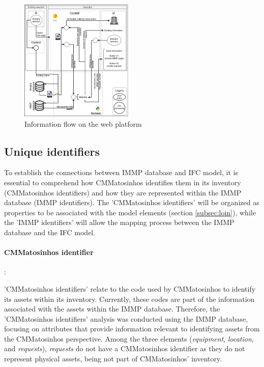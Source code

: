 \documentclass[a4paper, 10pt, twocolumn, twoside]{article}
\begin{document}
\begin{figure}[!htb]
    \centering
    \includegraphics[width=0.48\textwidth]{Images/fluxo.pdf}
    \caption{Information flow on the web platform}
    \label{fig_fluxo}
\end{figure}

\subsection{Unique identifiers}
\label{subsec:identifiers}

To establish the connections between IMMP database and IFC model, it is essential to comprehend how CMMatosinhos identifies them in its inventory (CMMatosinhos identifiers) and how they are represented within the IMMP database (IMMP identifiers). The 'CMMatosinhos identifiers' will be organized as properties to be associated with the model elements (section \ref{subsec:loin}), while the 'IMMP identifiers' will allow the mapping process between the IMMP database and the IFC model.

\paragraph{CMMatosinhos identifier}:

'CMMatosinhos identifiers' relate to the code used by CMMatosinhos to identify its assets within its inventory. Currently, these codes are part of the information associated with the assets within the IMMP database. Therefore, the 'CMMatosinhos identifiers' analysis was conducted using the IMMP database, focusing on attributes that provide information relevant to identifying assets from the CMMatosinhos perspective. Among the three elements (\emph{equipment}, \emph{location}, and \emph{requests}), \emph{requests} do not have a CMMatosinhos identifier as they do not represent physical assets, being not part of CMMatosinhos' inventory. 
\end{document}
